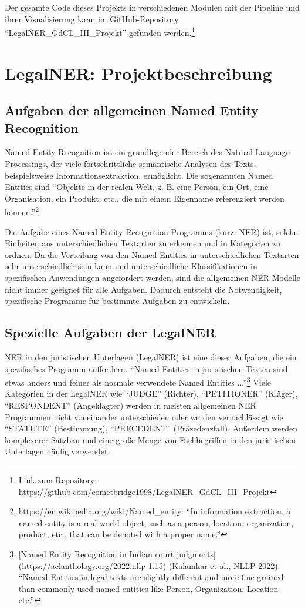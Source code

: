 \documentclass[paper=A4, ngerman, fontsize=12pt]{article}
\begin{document}
	\index Der gesamte Code dieses Projekts in verschiedenen Modulen mit der Pipeline und ihrer Visualisierung kann im GitHub-Repository \enquote{LegalNER\_GdCL\_III\_Projekt} gefunden werden.\footnote{Link zum Repository: https://github.com/cometbridge1998/LegalNER\_GdCL\_III\_Projekt}
	
	\section{LegalNER: Projektbeschreibung}
	\subsection{Aufgaben der allgemeinen Named Entity Recognition}
	\noindent
	Named Entity Recognition ist ein grundlegender Bereich des Natural Language Processings, der viele fortschrittliche semantische Analysen des Texts, beispielsweise Informationsextraktion, ermöglicht. Die sogenannten Named Entities sind \enquote{Objekte in der realen Welt, z. B. eine Person, ein Ort, eine Organisation, ein Produkt, etc., die mit einem Eigenname referenziert werden können.}\footnote{https://en.wikipedia.org/wiki/Named\_entity: \enquote{In information extraction, a named entity is a real-world object, such as a person, location, organization, product, etc., that can be denoted with a proper name.}}
	
	Die Aufgabe eines Named Entity Recognition Programms (kurz: NER) ist, solche Einheiten aus unterschiedlichen Textarten zu erkennen und in Kategorien zu ordnen. Da die Verteilung von den Named Entities in unterschiedlichen Textarten sehr unterschiedlich sein kann und unterschiedliche Klassifikationen in spezifischen Anwendungen angefordert werden, sind die allgemeinen NER Modelle nicht immer geeignet für alle Aufgaben. Dadurch entsteht die Notwendigkeit, spezifische Programme für bestimmte Aufgaben zu entwickeln. 
	
	\subsection{Spezielle Aufgaben der LegalNER}
	\noindent
	NER in den juristischen Unterlagen (LegalNER) ist eine dieser Aufgaben, die ein spezifisches Programm auffordern.  \enquote{Named Entities in juristischen Texten sind etwas anders und feiner als normale verwendete Named Entities ...}\footnote{[Named Entity Recognition in Indian court judgments](https://aclanthology.org/2022.nllp-1.15) (Kalamkar et al., NLLP 2022): \enquote{Named Entities in legal texts are slightly different and more fine-grained than commonly used named entities like Person, Organization, Location etc.}} Viele Kategorien in der LegalNER wie \enquote{JUDGE} (Richter), \enquote{PETITIONER} (Kläger), \enquote{RESPONDENT} (Angeklagter) werden in meisten allgemeinen NER Programmen nicht voneinander unterschieden oder werden vernachlässigt wie \enquote{STATUTE} (Bestimmung), \enquote{PRECEDENT} (Präzedenzfall). Außerdem werden komplexerer Satzbau und eine große Menge von Fachbegriffen in den juristischen Unterlagen häufig verwendet. 
	
\end{document}
